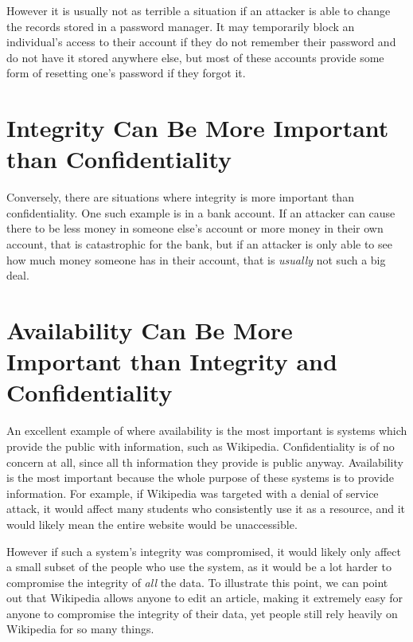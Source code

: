 \documentclass{article}
\begin{document}
However it is usually not as terrible a situation if an attacker is able to change the records stored in a password manager. It may temporarily block an individual's access to their account if they do not remember their password and do not have it stored anywhere else, but most of these accounts provide some form of resetting one's password if they forgot it.

\section{Integrity Can Be More Important than Confidentiality}

Conversely, there are situations where integrity is more important than confidentiality. One such example is in a bank account. If an attacker can cause there to be less money in someone else's account or more money in their own account, that is catastrophic for the bank, but if an attacker is only able to see how much money someone has in their account, that is \emph{usually} not such a big deal.

\section{Availability Can Be More Important than Integrity and Confidentiality}

An excellent example of where availability is the most important is systems which provide the public with information, such as Wikipedia. Confidentiality is of no concern at all, since all th information they provide is public anyway. Availability is the most important because the whole purpose of these systems is to provide information. For example, if Wikipedia was targeted with a denial of service attack, it would affect many students who consistently use it as a resource, and it would likely mean the entire website would be unaccessible.

However if such a system's integrity was compromised, it would likely only affect a small subset of the people who use the system, as it would be a lot harder to compromise the integrity of \emph{all} the data. To illustrate this point, we can point out that Wikipedia allows anyone to edit an article, making it extremely easy for anyone to compromise the integrity of their data, yet people still rely heavily on Wikipedia for so many things.
\end{document}

